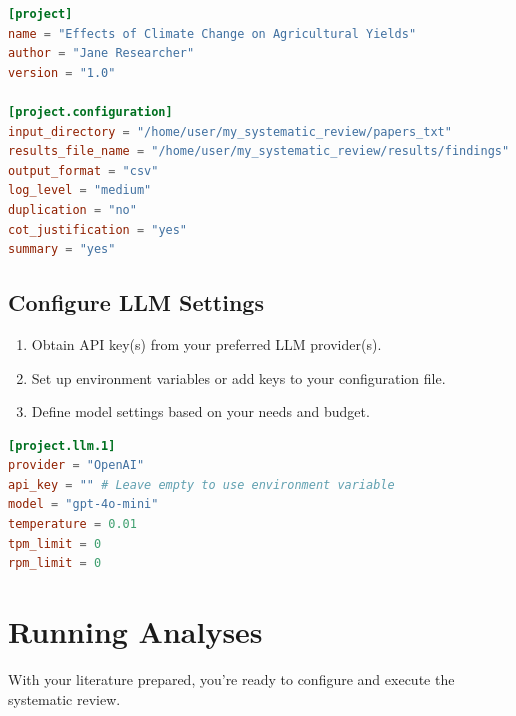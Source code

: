\begin{configbox}
\begin{lstlisting}[language=TOML]
[project]
name = "Effects of Climate Change on Agricultural Yields"
author = "Jane Researcher"
version = "1.0"

[project.configuration]
input_directory = "/home/user/my_systematic_review/papers_txt"
results_file_name = "/home/user/my_systematic_review/results/findings"
output_format = "csv"
log_level = "medium"
duplication = "no"
cot_justification = "yes"
summary = "yes"
\end{lstlisting}
\end{configbox}


\subsection{Configure LLM Settings}

\begin{enumerate}
    \item Obtain API key(s) from your preferred LLM provider(s).
    \item Set up environment variables or add keys to your configuration file.
    \item Define model settings based on your needs and budget.
\end{enumerate}

\begin{configbox}
\begin{lstlisting}[language=TOML]
[project.llm.1]
provider = "OpenAI"
api_key = "" # Leave empty to use environment variable
model = "gpt-4o-mini"
temperature = 0.01
tpm_limit = 0
rpm_limit = 0
\end{lstlisting}
\end{configbox}

\section{Running Analyses}

With your literature prepared, you're ready to configure and execute the systematic review.

